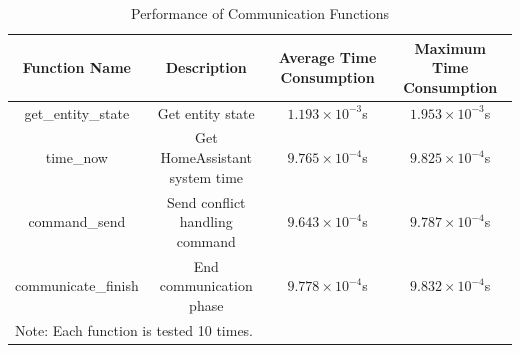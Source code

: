 \begin{table}[htpb]
	\caption{Performance of Communication Functions}
	\label{performance_communication_function}
	\centering
	\begin{adjustbox}{width=0.95\textwidth}
		\begin{tabular}{c|c|c|c}
			\hline
			\textbf{Function Name} & \textbf{Description} & \textbf{Average Time Consumption} & \textbf{Maximum Time Consumption}\\
			\hline
			get\_entity\_state & Get entity state & $1.193 \times 10^{-3}$s & $1.953 \times 10^{-3}$s \\
			\hline
			time\_now & Get HomeAssistant system time & $9.765 \times 10^{-4}$s & $9.825 \times 10^{-4}$s \\
			\hline
			command\_send & Send conflict handling command & $9.643 \times 10^{-4}$s & $9.787 \times 10^{-4}$s \\
			\hline
			communicate\_finish & End communication phase & $9.778 \times 10^{-4}$s & $9.832 \times 10^{-4}$s \\
			\hline
			\multicolumn{4}{l}{Note: Each function is tested 10 times.} \\
		\end{tabular}
	\end{adjustbox}
\end{table}